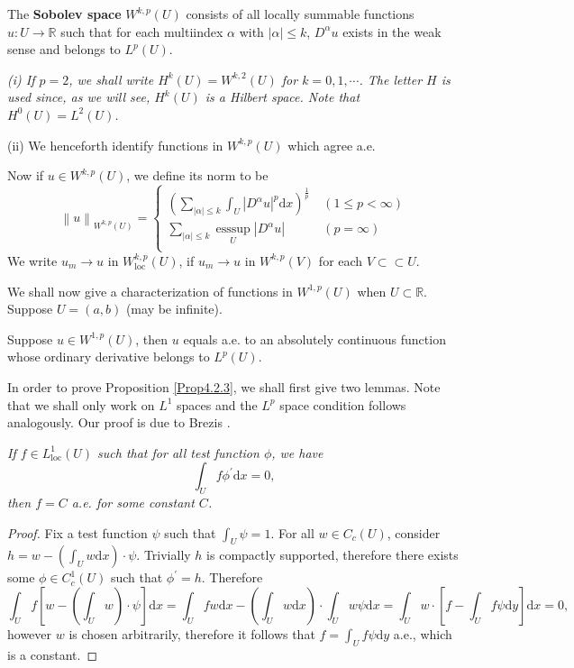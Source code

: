 \begin{definition}
The \textbf{Sobolev space} $W^{k,p}(U)$ consists of all locally summable functions $u:U\to\mathbb{R}$ such that for each multiindex $\alpha$ with $|\alpha|\le k$, $D^\alpha u$ exists in the weak sense and belongs to $L^p(U)$.
\end{definition}
\begin{note}\em
(i) If $p=2$, we shall write $H^k(U)=W^{k,2}(U)$ for $k=0,1,\cdots$. The letter $H$ is used since, as we will see, $H^k(U)$ is a Hilbert space. Note that $H^0(U)=L^2(U)$.\par
(ii) We henceforth identify functions in $W^{k,p}(U)$ which agree a.e.
\end{note}
Now if $u\in W^{k,p}(U)$, we define its norm to be 
$$
\left\| u \right\| _{W^{k,p}\left( U \right)}=\left\{ \begin{aligned}
	\left( \sum_{\left| \alpha \right|\le k}{\int_U{\left| D^{\alpha}u \right|^p\mathrm{d}x}} \right) ^{\frac{1}{p}}&\ \left( 1\le p<\infty \right)\\
	\sum_{\left| \alpha \right|\le k}{\mathop {\mathrm{ess} \mathrm{sup}} \limits_{U}\left| D^{\alpha}u \right|}&\ \left( p=\infty \right)\\
\end{aligned} \right. 
$$
We write $u_m\to u$ in $W_{\mathrm{loc}}^{k,p}(U)$, if $u_m\to u$ in $W^{k,p}(V)$ for each $V\subset\subset U$.\par
We shall now give a characterization of functions in $W^{1,p}(U)$ when $U\subset\mathbb{R}$. Suppose $U=(a,b)$ (may be infinite).
\begin{proposition}\label{Prop4.2.3}
Suppose $u\in W^{1,p}(U)$, then $u$ equals a.e. to an absolutely continuous function whose ordinary derivative belongs to $L^p(U)$.
\end{proposition}
In order to prove Proposition \ref{Prop4.2.3}, we shall first give two lemmas. Note that we shall only work on $L^1$ spaces and the $L^p$ space condition follows analogously. Our proof is due to Brezis \cite{brezis2011functional}.
\begin{lemma}\em
If $f\in L_{\mathrm{loc}}^1(U)$ such that for all test function $\phi$, we have 
$$
\int_U{f\phi ^{\prime}\mathrm{d}x}=0,
$$
then $f=C$ a.e. for some constant $C$.
\end{lemma}
\begin{proof}
Fix a test function $\psi$ such that $\int_U\psi=1$. For all $w\in C_c(U)$, consider $h=w-\left(\int_U w\mathrm{d}x\right)\cdot\psi$. Trivially $h$ is compactly supported, therefore there exists some $\phi\in C_c^1(U)$ such that $\phi^\prime=h$. Therefore 
$$
\int_U{f\left[ w-\left( \int_U{w} \right) \cdot \psi \right] \mathrm{d}x}=\int_U{fw\mathrm{d}x}-\left( \int_U{w\mathrm{d}x} \right) \cdot \int_U{w\psi \mathrm{d}x}=\int_U{w\cdot \left[ f-\int_U{f\psi \mathrm{d}y} \right] \mathrm{d}x}=0,
$$
however $w$ is chosen arbitrarily, therefore it follows that $f=\int_U{f\psi \mathrm{d}y}$ a.e., which is a constant.
\end{proof}
